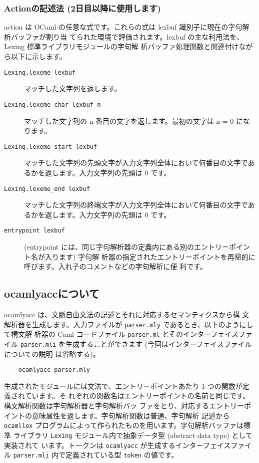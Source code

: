 \documentclass[a4paper,11pt]{jsarticle}
\begin{document}
\subsubsection{Actionの記述法 (2日目以降に使用します)}

action は OCaml の任意な式です。これらの式は lexbuf 識別子に現在の字句解析バッファが割り当
てられた環境で評価されます。lexbuf の主な利用法を、Lexing 標準ライブラリモジュールの字句解
析バッファ処理関数と関連付けながら以下に示します。

\begin{description}
\item [\texttt{Lexing.lexeme lexbuf}]
  マッチした文字列を返します。
\item [\texttt{Lexing.lexeme\_char lexbuf n}]
  マッチした文字列の n 番目の文字を返します。最初の文字は n = 0 になります。
\item [\texttt{Lexing.lexeme\_start lexbuf}]
  マッチした文字列の先頭文字が入力文字列全体において何番目の文字であるかを返します。入力文字列の先頭は 0 です。
\item [\texttt{Lexing.lexeme\_end lexbuf}]
  マッチした文字列の終端文字が入力文字列全体において何番目の文字であるかを返します。入力文字列の先頭は 0 です。
\item [\texttt{entrypoint lexbuf}]
  (entrypoint には、同じ字句解析器の定義内にある別のエントリーポイント名が入ります) 字句解
  析器の指定されたエントリーポイントを再帰的に呼びます。入れ子のコメントなどの字句解析に便
  利です。
\end{description}

\subsection{ocamlyaccについて}

ocamlyacc は、文脈自由文法の記述とそれに対応するセマンティクスから構
文解析器を生成します。入力ファイルが \verb|parser.mly|  であるとき、以下のようにして構文解
析器の Caml コードファイル \verb|parser.ml| とそのインターフェイスファイル
\verb|parser.mli|  を生成することができます (今回はインターフェイスファイルについての説明
は省略する)。

\begin{lstlisting}
    ocamlyacc parser.mly
\end{lstlisting}

生成されたモジュールには文法で、エントリーポイントあたり 1 つの関数が定義されています。そ
れぞれの関数名はエントリーポイントの名前と同じです。構文解析関数は字句解析器と字句解析バッ
ファをとり、対応するエントリーポイントの意味属性を返します。字句解析関数は普通、字句解析
記述から \verb|ocamllex| プログラムによって作られたものを用います。字句解析バッファは標準
ライブラリ \verb|Lexing| モジュール内で抽象データ型 (abstract data type) として実装されて
います。トークンは \verb|ocamlyacc| が生成するインターフェイスファイル \verb|parser.mli|
内で定義されている型 \verb|token| の値です。
\end{document}
